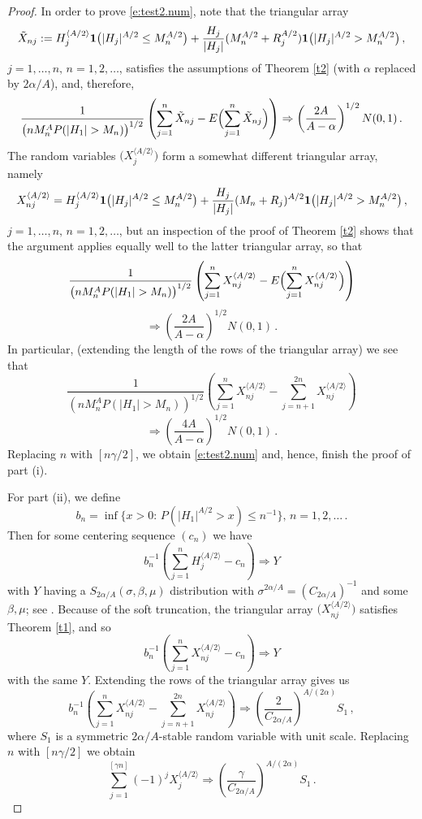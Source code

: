 \documentclass[11pt]{amsart}
\numberwithin{equation}{section}
\begin{document}
\begin{proof}
In order to prove \eqref{e:test2.num}, note that the triangular
array
$$
\tilde X_{nj}:=H_j^{\langle A/2\rangle}{{\bf 1}}\bigl(|H_j|^{A/2}\le
M_n^{A/2}\bigr)
+\frac{H_j}{|H_j|}(M_n^{A/2}+R_j^{A/2}){{\bf 1}}\bigl(|H_j|^{A/2}>M_n^{A/2}
\bigr)\,,
$$
$j=1,\ldots, n, \, n=1,2,\ldots$, satisfies the assumptions of Theorem
\ref{t2} (with $\alpha$ replaced by $2\alpha/A$), and, therefore,
$$
\frac{1}{ \bigl( nM_n^A P(|H_1|>M_n)\bigr)^{1/2}}\left( \sum_{j=1}^n
\tilde X_{nj} -
E \Bigl(  \sum_{j=1}^n \tilde X_{nj}\Bigr)\right)
\Rightarrow \left(\frac{2A}{A-\alpha}\right)^{1/2} N(0,1)\,.
$$
The random variables $\bigl( X_j^{\langle A/2\rangle}\bigr)$ form a
somewhat different triangular array, namely
$$
X_{nj}^{\langle A/2\rangle}=H_j^{\langle
A/2\rangle}{{\bf 1}}\bigl(|H_j|^{A/2}\le M_n^{A/2}\bigr)
+\frac{H_j}{|H_j|}(M_n+R_j)^{A/2}{{\bf 1}}\bigl(|H_j|^{A/2}>M_n^{A/2}
\bigr)\,,
$$
$j=1,\ldots, n, \, n=1,2,\ldots$, but an inspection of the proof
of Theorem \ref{t2} shows that the argument applies equally well
to the latter triangular array, so that
$$
\frac{1}{ \bigl( nM_n^A P(|H_1|>M_n)\bigr)^{1/2}}\left( \sum_{j=1}^n
X_{nj}^{\langle
A/2\rangle} -
E \Bigl(  \sum_{j=1}^n X_{nj}^{\langle A/2\rangle}\Bigr)\right)
$$
$$
\Rightarrow \left(\frac{2A}{A-\alpha}\right)^{1/2} N(0,1)\,.
$$
In particular, (extending the length of the rows of the triangular
array) we see that
$$
\frac{1}{ \left( nM_n^A P(|H_1|>M_n)\right)^{1/2}}\left( \sum_{j=1}^n
X_{nj}^{\langle A/2\rangle} - \sum_{j=n+1}^{2n} X_{nj}^{\langle
A/2\rangle}\right)
$$
$$
\Rightarrow \left(\frac{4A}{A-\alpha}\right)^{1/2} N(0,1)\,.
$$
Replacing $n$ with $[n\gamma/2]$, we obtain \eqref{e:test2.num} and,
hence, finish the proof of  part (i).

For part (ii), we define
$$
b_n = \inf\bigl\{ x>0:\, P(|H_1|^{A/2}>x)\leq n^{-1}\bigr\},\,
n=1,2,\ldots \,.
$$
Then for some centering sequence $(c_n)$ we have
$$
b_n^{-1}\left(\sum_{j=1}^nH_j^{\langle A/2\rangle}-c_n\right)
\Rightarrow Y
$$
with $Y$ having a $S_{2\alpha/A}(\sigma,\beta,\mu)$ distribution with
$\sigma^{2\alpha/A} = (C_{2\alpha/A})^{-1}$ and some $\beta,\mu$; see
\cite{feller:1971}. Because of the soft truncation, the triangular
array $\bigl( X_{nj}^{\langle A/2\rangle}\bigr)$ satisfies Theorem
\ref{t1}, and so
$$
b_n^{-1}\left(\sum_{j=1}^nX_{nj}^{\langle A/2\rangle}-c_n\right)
\Rightarrow Y
$$
with the same $Y$. Extending the rows of the triangular array gives us
$$
b_n^{-1}\left(\sum_{j=1}^nX_{nj}^{\langle
A/2\rangle}-\sum_{j=n+1}^{2n}X_{nj}^{\langle A/2\rangle} \right)
\Rightarrow \left( \frac{2}{C_{2\alpha/A}}\right)^{A/(2\alpha)}S_1\,,
$$
where $S_1$ is a symmetric $2\alpha/A$-stable
random variable with unit scale. Replacing $n$ with $[n\gamma/2]$
we obtain
\begin{equation} \label{e:t2:soft.1}
\sum_{j=1}^{[\gamma
      n]}(-1)^jX_{j}^{\langle A/2\rangle} \Rightarrow
\left( \frac{\gamma}{C_{2\alpha/A}}\right)^{A/(2\alpha)}S_1\,.
\end{equation}


\end{proof}
\end{document}

